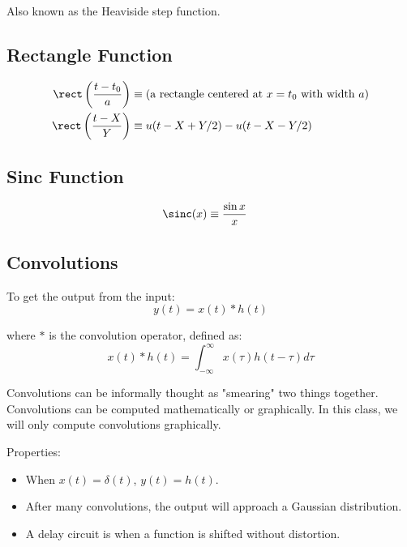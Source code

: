 Also known as the Heaviside step function.

\subsection{Rectangle Function}

\begin{align*}
    \rect\left(\frac{t - t_0}{a}\right) & \equiv (\text{a rectangle centered at $x=t_0$ with width $a$}) \\
    \rect\left(\frac{t - X}{Y}\right)   & \equiv u(t - X + Y/2) - u(t - X - Y/2)
\end{align*}

\subsection{Sinc Function}

\begin{align*}
    \sinc(x) & \equiv \frac{\sin x}{x}
\end{align*}

\subsection{Convolutions}

To get the output from the input:
\begin{equation*}
    y(t) = x(t) \ast h(t)
\end{equation*}

where $\ast$ is the convolution operator, defined as:
\begin{equation*}
    x(t) \ast h(t) = \int_{-\infty}^{\infty} x(\tau) h(t - \tau) d\tau
\end{equation*}

Convolutions can be informally thought as "smearing" two things together. Convolutions can be computed mathematically or graphically. In this class, we will only compute convolutions graphically.

Properties:
\begin{itemize}
    \item When $x(t) = \delta(t)$, $y(t) = h(t)$.
    \item After many convolutions, the output will approach a Gaussian distribution.
    \item A delay circuit is when a function is shifted without distortion.
\end{itemize}
